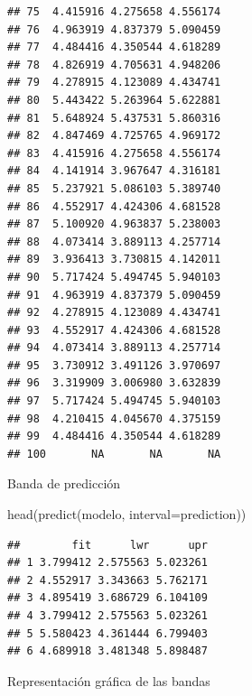 \documentclass[
]{book}
\newenvironment{Shaded}{\begin{snugshade}}{\end{snugshade}}
\newcommand{\AttributeTok}[1]{\textcolor[rgb]{0.77,0.63,0.00}{#1}}
\newcommand{\FunctionTok}[1]{\textcolor[rgb]{0.00,0.00,0.00}{#1}}
\newcommand{\NormalTok}[1]{#1}
\newcommand{\StringTok}[1]{\textcolor[rgb]{0.31,0.60,0.02}{#1}}
\theoremstyle{break}
\theoremstyle{nonumberplain}
\begin{document}
\begin{verbatim}
## 75  4.415916 4.275658 4.556174
## 76  4.963919 4.837379 5.090459
## 77  4.484416 4.350544 4.618289
## 78  4.826919 4.705631 4.948206
## 79  4.278915 4.123089 4.434741
## 80  5.443422 5.263964 5.622881
## 81  5.648924 5.437531 5.860316
## 82  4.847469 4.725765 4.969172
## 83  4.415916 4.275658 4.556174
## 84  4.141914 3.967647 4.316181
## 85  5.237921 5.086103 5.389740
## 86  4.552917 4.424306 4.681528
## 87  5.100920 4.963837 5.238003
## 88  4.073414 3.889113 4.257714
## 89  3.936413 3.730815 4.142011
## 90  5.717424 5.494745 5.940103
## 91  4.963919 4.837379 5.090459
## 92  4.278915 4.123089 4.434741
## 93  4.552917 4.424306 4.681528
## 94  4.073414 3.889113 4.257714
## 95  3.730912 3.491126 3.970697
## 96  3.319909 3.006980 3.632839
## 97  5.717424 5.494745 5.940103
## 98  4.210415 4.045670 4.375159
## 99  4.484416 4.350544 4.618289
## 100       NA       NA       NA
\end{verbatim}

Banda de predicción

\begin{Shaded}
\begin{Highlighting}[]
\FunctionTok{head}\NormalTok{(}\FunctionTok{predict}\NormalTok{(modelo, }\AttributeTok{interval=}\StringTok{\textquotesingle{}prediction\textquotesingle{}}\NormalTok{))}
\end{Highlighting}
\end{Shaded}

\begin{verbatim}
##        fit      lwr      upr
## 1 3.799412 2.575563 5.023261
## 2 4.552917 3.343663 5.762171
## 3 4.895419 3.686729 6.104109
## 4 3.799412 2.575563 5.023261
## 5 5.580423 4.361444 6.799403
## 6 4.689918 3.481348 5.898487
\end{verbatim}

Representación gráfica de las bandas
\end{document}
